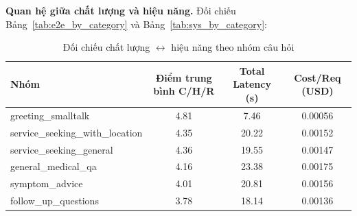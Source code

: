 \begin{table}[H]
\centering
{}
\caption{Hệ số hiệu năng theo nhóm câu hỏi}
\label{tab:sys_by_category}
\end{table}

\textbf{Quan hệ giữa chất lượng và hiệu năng.}
Đối chiếu Bảng~\ref{tab:e2e_by_category} và Bảng~\ref{tab:sys_by_category}:

\begin{table}[H]
\centering
\begin{tabular}{|l|c|c|c|}
\hline
\textbf{Nhóm} & \textbf{Điểm trung bình C/H/R} & \textbf{Total Latency (s)} & \textbf{Cost/Req (USD)} \\
\hline
greeting\_smalltalk              & 4.81 & 7.46  & 0.00056 \\
\hline
service\_seeking\_with\_location & 4.35 & 20.22 & 0.00152 \\
\hline
service\_seeking\_general        & 4.36 & 19.55 & 0.00147 \\
\hline
general\_medical\_qa             & 4.16 & 23.38 & 0.00175 \\
\hline
symptom\_advice                  & 4.01 & 20.81 & 0.00156 \\
\hline
follow\_up\_questions            & 3.78 & 18.14 & 0.00136 \\
\hline
\end{tabular}
\caption{Đối chiếu chất lượng $\leftrightarrow$ hiệu năng theo nhóm câu hỏi}
\label{tab:e2e_qa_vs_sys}
\end{table}

